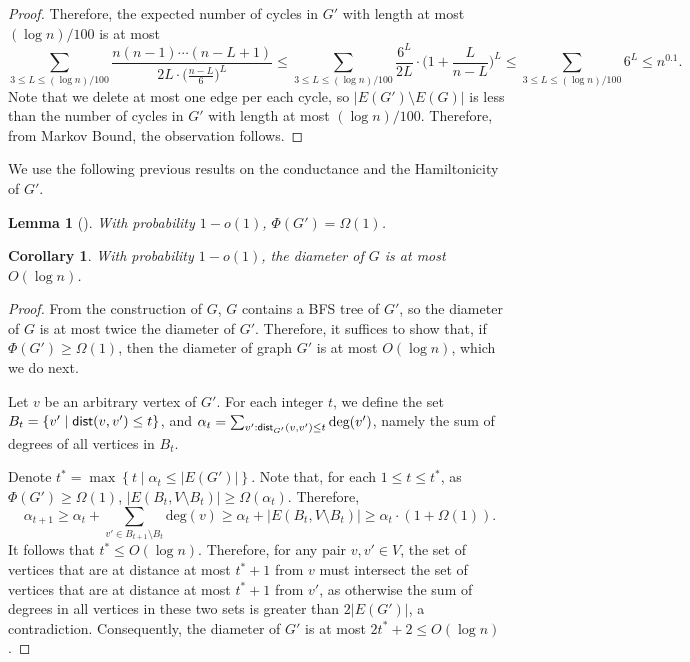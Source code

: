 \documentclass[11pt]{article}
\newtheorem{corollary}[theorem]{Corollary}
\newtheorem{lemma}[theorem]{Lemma}
\theoremstyle{definition}
\newcommand{\set}[1]{\left\{ #1 \right\}}
\newcommand{\dist}{\textnormal{\textsf{dist}}}
\def\deg{\textrm{deg}}
\newcounter{note}
\begin{document}
\begin{titlepage}
\begin{proof}
Therefore, the expected number of cycles in $G'$ with length at most $(\log n)/100$ is at most 
\[\sum_{3\le L\le (\log n)/100} \frac{n(n-1)\cdots (n-L+1)}{2L\cdot \big(\frac{n-L}{6}\big)^{L}}\le \sum_{3\le L\le (\log n)/100} \frac{6^L}{2L}\cdot \bigg(1+\frac{L}{n-L}\bigg)^{L}\le \sum_{3\le L\le (\log n)/100} 6^L\le n^{0.1}. \]
Note that we delete at most one edge per each cycle, so $|E(G')\setminus E(G)|$ is less than the number of cycles in $G'$ with length at most $(\log n)/100$. Therefore, from Markov Bound, the observation follows.
\end{proof}



We use the following previous results on the conductance and the Hamiltonicity of $G'$.

\begin{lemma} [\cite{puder2015expansion}] \label{lem:expansion}
    With probability $1-o(1)$, $\Phi(G') = \Omega(1)$.
\end{lemma}

\begin{corollary}
\label{cor: diam}
With probability $1-o(1)$, the diameter of $G$ is at most $O(\log n)$.
\end{corollary}
\begin{proof}
From the construction of $G$, $G$ contains a BFS tree of $G'$, so the diameter of $G$ is at most twice the diameter of $G'$. Therefore, it suffices to show that, if $\Phi(G') \ge \Omega(1)$, then the diameter of graph $G'$ is at most $O(\log n)$, which we do next.

Let $v$ be an arbitrary vertex of $G'$. For each integer $t$, we define the set $B_t=\set{v'\mid \dist(v,v')\le t}$, and $\alpha_t=\sum_{v': \dist_{G'}(v,v')\le t}\deg(v')$, namely  the sum of degrees of all vertices in $B_t$. 

Denote $t^*=\max\set{t\mid \alpha_t\le |E(G')|}$.
Note that, for each $1\le t\le t^*$, as $\Phi(G') \ge \Omega(1)$,
$|E(B_t,V\setminus B_t)|\ge \Omega(\alpha_t)$. Therefore, \[\alpha_{t+1}\ge \alpha_t+\sum_{v'\in B_{t+1}\setminus B_{t}}\deg(v)\ge \alpha_t+ |E(B_t,V\setminus B_t)|\ge \alpha_t\cdot (1+\Omega(1)).\]
It follows that $t^*\le O(\log n)$. Therefore, for any pair $v,v'\in V$, the set of vertices that are at distance at most $t^*+1$ from $v$ must intersect the set of vertices that are at distance at most $t^*+1$ from $v'$, as otherwise the sum of degrees in all vertices in these two sets is greater than $2|E(G')|$, a contradiction. Consequently, the diameter of $G'$ is at most $2t^*+2\le O(\log n)$.
\end{proof}


\end{titlepage}
\end{document}
